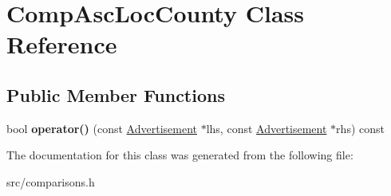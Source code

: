 \hypertarget{class_comp_asc_loc_county}{}\section{Comp\+Asc\+Loc\+County Class Reference}
\label{class_comp_asc_loc_county}
\subsection*{Public Member Functions}
\begin{DoxyCompactItemize}
\item 
\hypertarget{class_comp_asc_loc_county_a5850972ab29722b8b21192bb7b4b083f}{}bool {\bfseries operator()} (const \hyperlink{class_advertisement}{Advertisement} $\ast$lhs, const \hyperlink{class_advertisement}{Advertisement} $\ast$rhs) const \label{class_comp_asc_loc_county_a5850972ab29722b8b21192bb7b4b083f}

\end{DoxyCompactItemize}


The documentation for this class was generated from the following file\+:\begin{DoxyCompactItemize}
\item 
src/comparisons.\+h\end{DoxyCompactItemize}
